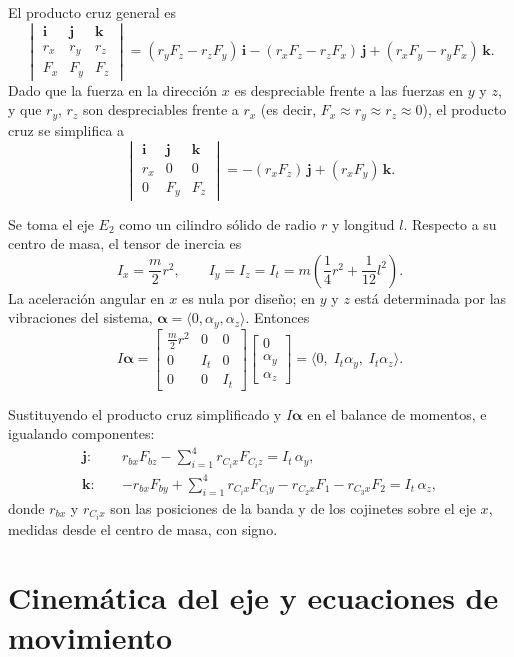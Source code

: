 El producto cruz general es
\[
\begin{vmatrix}
\mathbf i & \mathbf j & \mathbf k\\
r_x & r_y & r_z\\
F_x & F_y & F_z
\end{vmatrix}
=(r_yF_z-r_zF_y)\,\mathbf i-(r_xF_z-r_zF_x)\,\mathbf j+(r_xF_y-r_yF_x)\,\mathbf k .
\]
Dado que la fuerza en la dirección $x$ es despreciable frente a las fuerzas en $y$ y $z$, y que $r_y$, $r_z$ son 
despreciables frente a $r_x$ (es decir, $F_x\approx r_y\approx r_z\approx0$), el producto cruz se simplifica a
\[
\begin{vmatrix}
\mathbf i & \mathbf j & \mathbf k\\
r_x & 0 & 0\\
0 & F_y & F_z
\end{vmatrix}
=-(r_xF_z)\,\mathbf j+(r_xF_y)\,\mathbf k .
\]

Se toma el eje $E_2$ como un cilindro sólido de radio $r$ y longitud $l$. Respecto a su centro de masa, el tensor de inercia es
\[
I_x=\frac{m}{2}r^2,\qquad
I_y=I_z=I_t=m\left(\frac14 r^2+\frac1{12}l^2\right).
\]
La aceleración angular en $x$ es nula por diseño; en $y$ y $z$ está determinada por las vibraciones del sistema, 
$\boldsymbol\alpha=\langle0,\alpha_y,\alpha_z\rangle$. Entonces
\[
I\boldsymbol\alpha=
\begin{bmatrix}
\frac{m}{2}r^2 & 0 & 0\\
0 & I_t & 0\\
0 & 0 & I_t
\end{bmatrix}
\begin{bmatrix}0\\ \alpha_y\\ \alpha_z\end{bmatrix}
=\langle0,\;I_t\alpha_y,\;I_t\alpha_z\rangle .
\]

Sustituyendo el producto cruz simplificado y $I\boldsymbol\alpha$ en el balance de momentos, e igualando componentes:
\begin{align*}
\mathbf j:\quad & r_{bx}F_{bz}-\sum_{i=1}^{4}r_{C_ix}F_{C_iz}=I_t\,\alpha_y,\\
\mathbf k:\quad & -r_{bx}F_{by}+\sum_{i=1}^{4}r_{C_ix}F_{C_iy}-r_{C_2x}F_1-r_{C_3x}F_2=I_t\,\alpha_z,
\end{align*}
donde $r_{bx}$ y $r_{C_ix}$ son las posiciones de la banda y de los cojinetes sobre el eje $x$, medidas desde el centro de masa,
con signo.

\section{Cinemática del eje y ecuaciones de movimiento}

